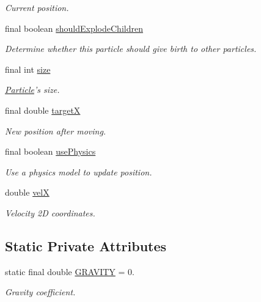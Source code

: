 \begin{DoxyCompactItemize}
\begin{DoxyCompactList}\small\item\em Current position. \end{DoxyCompactList}\item 
final boolean \hyperlink{classbattleship2D_1_1ui_1_1Particle_ae89e92c546d7ab12b38a1da0ed34470c}{should\-Explode\-Children}
\begin{DoxyCompactList}\small\item\em Determine whether this particle should give birth to other particles. \end{DoxyCompactList}\item 
final int \hyperlink{classbattleship2D_1_1ui_1_1Particle_aeed0f277dadb5f0f4d41d7852ee8f708}{size}
\begin{DoxyCompactList}\small\item\em \hyperlink{classbattleship2D_1_1ui_1_1Particle}{Particle}'s size. \end{DoxyCompactList}\item 
final double \hyperlink{classbattleship2D_1_1ui_1_1Particle_adac981aee070e317de343ce7b5967b73}{target\-X}
\begin{DoxyCompactList}\small\item\em New position after moving. \end{DoxyCompactList}\item 
final boolean \hyperlink{classbattleship2D_1_1ui_1_1Particle_ad1d8ec268600a69b4ae2986c9b1e4ec1}{use\-Physics}
\begin{DoxyCompactList}\small\item\em Use a physics model to update position. \end{DoxyCompactList}\item 
double \hyperlink{classbattleship2D_1_1ui_1_1Particle_a9e831b513842b2cd2e41fc1a2524e590}{vel\-X}
\begin{DoxyCompactList}\small\item\em Velocity 2\-D coordinates. \end{DoxyCompactList}\end{DoxyCompactItemize}
\subsection*{Static Private Attributes}
\begin{DoxyCompactItemize}
\item 
static final double \hyperlink{classbattleship2D_1_1ui_1_1Particle_ab1a0d8047fe05a97b83604fe032a7326}{G\-R\-A\-V\-I\-T\-Y} = 0.
\begin{DoxyCompactList}\small\item\em Gravity coefficient. \end{DoxyCompactList}\end{DoxyCompactItemize}


